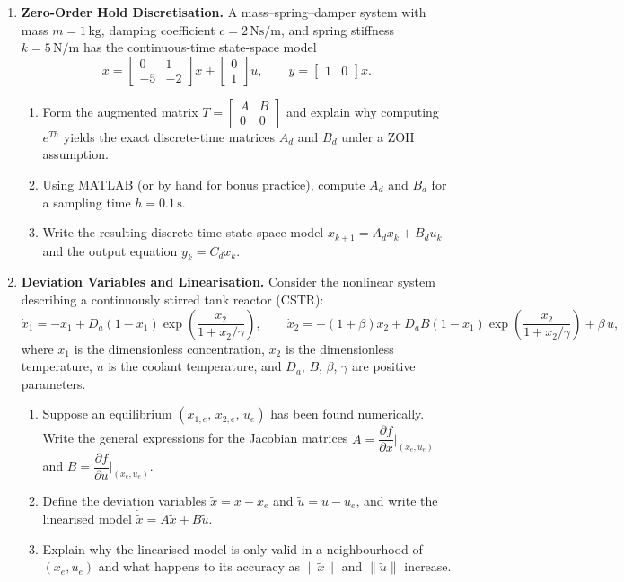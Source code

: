 \begin{enumerate}
\item \textbf{Zero-Order Hold Discretisation.}
A mass--spring--damper system with mass $m = 1\,\text{kg}$, damping coefficient $c = 2\,\text{Ns/m}$, and spring stiffness $k = 5\,\text{N/m}$ has the continuous-time state-space model
\[
\dot{x} = \begin{bmatrix} 0 & 1 \\ -5 & -2 \end{bmatrix} x + \begin{bmatrix} 0 \\ 1 \end{bmatrix} u, \qquad y = \begin{bmatrix} 1 & 0 \end{bmatrix} x.
\]
\begin{enumerate}
	\item[(a)] Form the augmented matrix
	$T = \begin{bmatrix} A & B \\ 0 & 0 \end{bmatrix}$
	and explain why computing $e^{Th}$ yields the exact discrete-time matrices $A_d$ and $B_d$ under a ZOH assumption.
	\item[(b)] Using MATLAB (or by hand for bonus practice), compute $A_d$ and $B_d$ for a sampling time $h = 0.1\,\text{s}$.
	\item[(c)] Write the resulting discrete-time state-space model $x_{k+1} = A_d x_k + B_d u_k$ and the output equation $y_k = C_d x_k$.
\end{enumerate}

\item \textbf{Deviation Variables and Linearisation.}
Consider the nonlinear system describing a continuously stirred tank reactor (CSTR):
\[
\dot{x}_1 = -x_1 + D_a(1 - x_1)\exp\!\left(\frac{x_2}{1 + x_2/\gamma}\right), \qquad
\dot{x}_2 = -(1+\beta)x_2 + D_a B(1 - x_1)\exp\!\left(\frac{x_2}{1 + x_2/\gamma}\right) + \beta\, u,
\]
where $x_1$ is the dimensionless concentration, $x_2$ is the dimensionless temperature, $u$ is the coolant temperature, and $D_a$, $B$, $\beta$, $\gamma$ are positive parameters.
\begin{enumerate}
	\item[(a)] Suppose an equilibrium $(x_{1,e},\, x_{2,e},\, u_e)$ has been found numerically. Write the general expressions for the Jacobian matrices
	$A = \dfrac{\partial f}{\partial x}\Big|_{(x_e, u_e)}$ and $B = \dfrac{\partial f}{\partial u}\Big|_{(x_e, u_e)}$.
	\item[(b)] Define the deviation variables $\tilde{x} = x - x_e$ and $\tilde{u} = u - u_e$, and write the linearised model $\dot{\tilde{x}} = A\tilde{x} + B\tilde{u}$.
	\item[(c)] Explain why the linearised model is only valid in a neighbourhood of $(x_e, u_e)$ and what happens to its accuracy as $\|\tilde{x}\|$ and $\|\tilde{u}\|$ increase.
\end{enumerate}


\end{enumerate}
